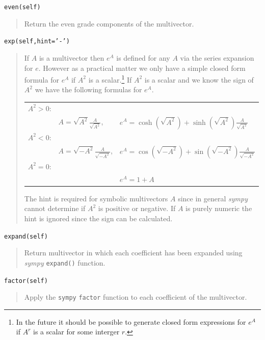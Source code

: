 \documentclass[12pt]{report}
\newcommand{\bfrac}[2]{\displaystyle\frac{#1}{#2}}
\newcommand{\lp}{\left (}
\newcommand{\rp}{\right )}
\newcommand{\f}[2]{{#1}\lp {#2} \rp}
\newcommand{\T}[1]{\texttt{#1}}
\begin{document}
\T{even(self)}
\begin{quote}
   Return the even grade components of the multivector.
\end{quote}

\T{exp(self,hint='-')}
\begin{quote}
	If $A$ is a multivector then $e^{A}$ is defined for any $A$ via the series expansion for $e$.  However as
	a practical matter we only have a simple closed form formula for $e^{A}$ if $A^{2}$ is a scalar.\footnote{In the
	future it should be possible to generate closed form expressions for $e^{A}$ if $A^{r}$ is a scalar for some 
	interger $r$.} If $A^{2}$ is a scalar and we know the sign of $A^{2}$ we have the following formulas for $e^{A}$.
	\begin{center}
	\begin{tabular}{lll}
		$A^{2} > 0$: & & \\
		& $A = \sqrt{A^{2}} \bfrac{A}{\sqrt{A^{2}}}$, & $e^{A} = \f{\cosh}{\sqrt{A^{2}}}+\f{\sinh}{\sqrt{A^{2}}}\bfrac{A}{\sqrt{A^{2}}}$ \\
		$A^{2} < 0$: & & \\
		& $A = \sqrt{-A^{2}} \bfrac{A}{\sqrt{-A^{2}}}$, & $e^{A} = \f{\cos}{\sqrt{-A^{2}}}+\f{\sin}{\sqrt{-A^{2}}}\bfrac{A}{\sqrt{-A^{2}}}$ \\
		$A^{2} = 0$: & & \\
		& & $e^{A} = 1 + A$
	\end{tabular}	
	\end{center}
    The hint is required for symbolic multivectors $A$ since in general \emph{sympy} cannot determine if
    $A^{2}$ is positive or negative.  If $A$ is purely numeric the hint is ignored since the sign can be calculated.
\end{quote}

\T{expand(self)}
\begin{quote}
   Return multivector in which each coefficient has been expanded using
   \emph{sympy} \T{expand()} function.
\end{quote}

\T{factor(self)}
\begin{quote}
   Apply the \T{sympy} \T{factor} function to each coefficient of the multivector.
\end{quote}
\end{document}
